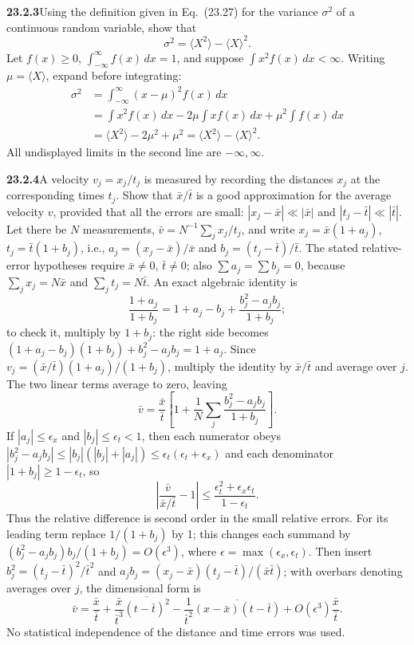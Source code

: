 \par\bigskip
\noindent\textbf{23.2.3}\quad Using the definition given in
Eq.~(23.27) for the variance $\sigma^{2}$ of a continuous random
variable, show that
\[
\sigma^{2}=\langle X^{2}\rangle-\langle X\rangle^{2}.
\]
\solution
Let $f(x)\ge0$, $\int_{-\infty}^{\infty}f(x)\,dx=1$, and suppose
$\int x^2f(x)\,dx<\infty$. Writing $\mu=\langle X\rangle$, expand
before integrating:
\begin{align*}
\sigma^2&=\int_{-\infty}^{\infty}(x-\mu)^2f(x)\,dx\\
&=\int x^2f(x)\,dx-2\mu\int xf(x)\,dx+\mu^2\int f(x)\,dx\\
&=\langle X^2\rangle-2\mu^2+\mu^2
=\boxed{\langle X^2\rangle-\langle X\rangle^2}.
\end{align*}
All undisplayed limits in the second line are $-\infty,\infty$.


\par\bigskip
\noindent\textbf{23.2.4}\quad A velocity $v_{j}=x_{j}/t_{j}$ is
measured by recording the distances $x_{j}$ at the corresponding
times $t_{j}$. Show that $\bar{x}/\bar{t}$ is a good
approximation for the average velocity $v$, provided that all
the errors are small: $|x_{j}-\bar{x}|\ll|\bar{x}|$ and
$|t_{j}-\bar{t}|\ll|\bar{t}|$.
\solution
Let there be $N$ measurements, $\bar v=N^{-1}\sum_jx_j/t_j$, and
write $x_j=\bar x(1+a_j)$, $t_j=\bar t(1+b_j)$, i.e.,
$a_j=(x_j-\bar x)/\bar x$ and $b_j=(t_j-\bar t)/\bar t$.
The stated relative-error hypotheses require $\bar x\ne0$, $\bar t\ne0$;
also $\sum a_j=\sum b_j=0$, because $\sum_jx_j=N\bar x$ and
$\sum_jt_j=N\bar t$. An exact algebraic identity is
\[
\frac{1+a_j}{1+b_j}=1+a_j-b_j+
\frac{b_j^2-a_jb_j}{1+b_j};
\]
to check it, multiply by $1+b_j$: the right side becomes
$(1+a_j-b_j)(1+b_j)+b_j^2-a_jb_j=1+a_j$.
Since $v_j=(\bar x/\bar t)(1+a_j)/(1+b_j)$, multiply the identity by
$\bar x/\bar t$ and average over $j$. The two linear terms average to
zero, leaving
\[
\boxed{\bar v=\frac{\bar x}{\bar t}
\left[1+\frac1N\sum_j\frac{b_j^2-a_jb_j}{1+b_j}\right]}.
\]
If $|a_j|\le\epsilon_x$ and $|b_j|\le\epsilon_t<1$, then each
numerator obeys $|b_j^2-a_jb_j|\le|b_j|(|b_j|+|a_j|)\le
\epsilon_t(\epsilon_t+\epsilon_x)$ and each denominator
$|1+b_j|\ge1-\epsilon_t$, so
\[
\left|\frac{\bar v}{\bar x/\bar t}-1\right|
\le\frac{\epsilon_t^2+\epsilon_x\epsilon_t}{1-\epsilon_t}.
\]
Thus the relative difference is second order in the small relative
errors. For its leading term replace $1/(1+b_j)$ by 1; this changes
each summand by $(b_j^2-a_jb_j)b_j/(1+b_j)=O(\epsilon^3)$, where
$\epsilon=\max(\epsilon_x,\epsilon_t)$. Then insert
$b_j^2=(t_j-\bar t)^2/\bar t^2$ and
$a_jb_j=(x_j-\bar x)(t_j-\bar t)/(\bar x\bar t)$; with overbars
denoting averages over $j$, the dimensional form is
\[
\bar v=\frac{\bar x}{\bar t}
+\frac{\bar x}{\bar t^3}\overline{(t-\bar t)^2}
-\frac1{\bar t^2}\overline{(x-\bar x)(t-\bar t)}+O(\epsilon^3)\frac{\bar x}{\bar t}.
\]
No statistical independence of the distance and time errors was used.



